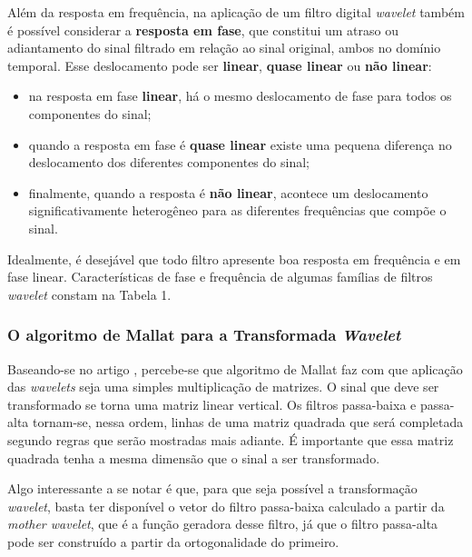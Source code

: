 			\par Além da resposta em frequência, na aplicação de um filtro digital \textit{wavelet} também é possível considerar a \textbf{resposta em fase}, que constitui um atraso ou adiantamento do sinal filtrado em relação ao sinal original, ambos no domínio temporal. Esse deslocamento pode ser \textbf{linear}, \textbf{quase linear} ou \textbf{não linear}: 
			
			\begin{itemize}
				\item na resposta em fase \textbf{linear}, há o mesmo deslocamento de fase para todos os componentes do sinal;
				\item quando a resposta em fase é \textbf{quase linear} existe uma pequena diferença no deslocamento dos diferentes componentes do sinal;
				\item finalmente, quando a resposta é \textbf{não linear}, acontece um deslocamento significativamente heterogêneo para as diferentes frequências que compõe o sinal.
				\end{itemize}
			
			\par Idealmente, é desejável que todo filtro apresente boa resposta em frequência e em fase linear. Características de fase e frequência de algumas famílias de filtros \textit{wavelet} constam na Tabela 1.
			
			

		\subsubsection{O algoritmo de Mallat para a Transformada \textit{Wavelet}}
			\par Baseando-se no artigo \cite{7079589}, percebe-se que algoritmo de Mallat faz com que aplicação das \textit{wavelets} seja uma simples multiplicação de matrizes. O sinal que deve ser transformado se torna uma matriz linear vertical. Os filtros passa-baixa e passa-alta tornam-se, nessa ordem, linhas de uma matriz quadrada que será completada segundo regras que serão mostradas mais adiante. É importante que essa matriz quadrada tenha a mesma dimensão que o sinal a ser transformado.
		
			\par Algo interessante a se notar é que, para que seja possível a transformação \textit{wavelet}, basta ter disponível o vetor do filtro passa-baixa calculado a partir da \textit{mother wavelet}, que é a função geradora desse filtro, já que o filtro passa-alta pode ser construído a partir da ortogonalidade do primeiro.
			
